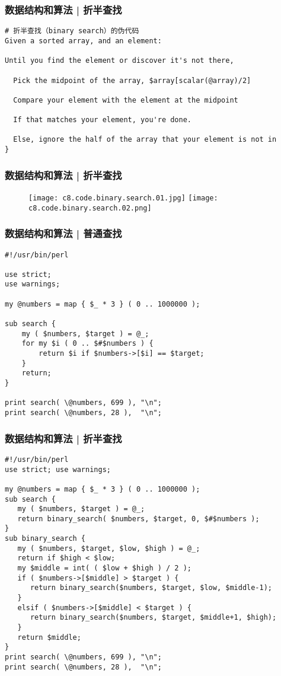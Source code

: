 \begin{frame}[fragile]
  \frametitle{数据结构和算法 | 折半查找}
\begin{lstlisting}[basicstyle=\small\tt]
# 折半查找（binary search）的伪代码
Given a sorted array, and an element:

Until you find the element or discover it's not there,

  Pick the midpoint of the array, $array[scalar(@array)/2]

  Compare your element with the element at the midpoint

  If that matches your element, you're done.

  Else, ignore the half of the array that your element is not in
}
\end{lstlisting}
\end{frame}

\begin{frame}
  \frametitle{数据结构和算法 | 折半查找}
  \begin{figure}
    \centering
    \texttt{[image: c8.code.binary.search.01.jpg]}
    \texttt{[image: c8.code.binary.search.02.png]}
  \end{figure}
\end{frame}

\begin{frame}[fragile]
  \frametitle{数据结构和算法 | 普通查找}
\begin{lstlisting}[basicstyle=\small\tt]
#!/usr/bin/perl

use strict;
use warnings;

my @numbers = map { $_ * 3 } ( 0 .. 1000000 );

sub search {
    my ( $numbers, $target ) = @_;
    for my $i ( 0 .. $#$numbers ) {
        return $i if $numbers->[$i] == $target;
    }
    return;
}

print search( \@numbers, 699 ), "\n";
print search( \@numbers, 28 ),  "\n";
\end{lstlisting}
\end{frame}

\begin{frame}[fragile]
  \frametitle{数据结构和算法 | 折半查找}
\begin{lstlisting}[basicstyle=\scriptsize\tt,numberstyle=\tiny]
#!/usr/bin/perl
use strict; use warnings;

my @numbers = map { $_ * 3 } ( 0 .. 1000000 );
sub search {
   my ( $numbers, $target ) = @_;
   return binary_search( $numbers, $target, 0, $#$numbers );
}
sub binary_search {
   my ( $numbers, $target, $low, $high ) = @_;
   return if $high < $low;
   my $middle = int( ( $low + $high ) / 2 );
   if ( $numbers->[$middle] > $target ) {
      return binary_search($numbers, $target, $low, $middle-1);
   }
   elsif ( $numbers->[$middle] < $target ) {
      return binary_search($numbers, $target, $middle+1, $high);
   }
   return $middle;
}
print search( \@numbers, 699 ), "\n";
print search( \@numbers, 28 ),  "\n";
\end{lstlisting}
\end{frame}

